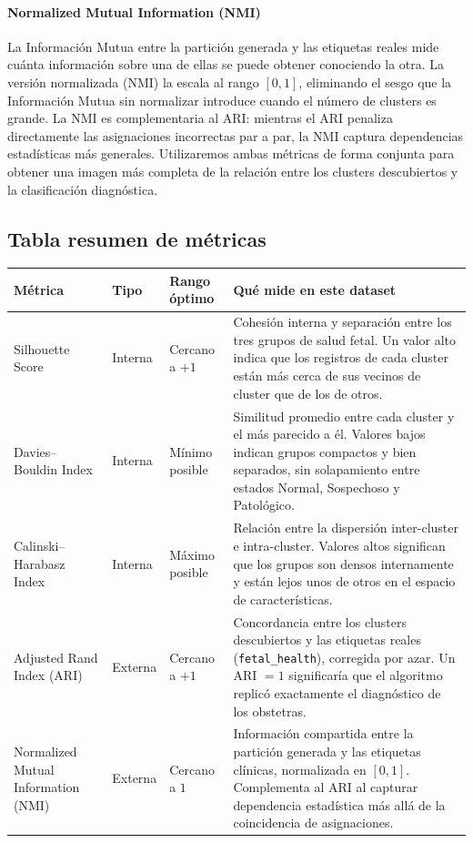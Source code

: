 \documentclass[12pt,letterpaper]{article}
\renewcommand{\arraystretch}{1.30}
\begin{document}
\paragraph{Normalized Mutual Information (NMI)}
La Información Mutua entre la partición generada y las etiquetas reales mide cuánta información
sobre una de ellas se puede obtener conociendo la otra. La versión normalizada (NMI) la escala al
rango $[0, 1]$, eliminando el sesgo que la Información Mutua sin normalizar introduce cuando el
número de clusters es grande. La NMI es complementaria al ARI: mientras el ARI penaliza
directamente las asignaciones incorrectas par a par, la NMI captura dependencias estadísticas más
generales. Utilizaremos ambas métricas de forma conjunta para obtener una imagen más completa de
la relación entre los clusters descubiertos y la clasificación diagnóstica.

\subsection{Tabla resumen de métricas}

\begin{table}[H]
\centering
\small
\renewcommand{\arraystretch}{1.3}
\begin{tabular}{|p{2.5cm}|p{2.5cm}|p{2.5cm}|p{7.5cm}|}
\hline
\rowcolor{headbg}
\textbf{Métrica} & \textbf{Tipo} & \textbf{Rango óptimo} & \textbf{Qué mide en este dataset} \\
\hline
Silhouette Score & Interna & Cercano a $+1$ & Cohesión interna y separación entre los tres grupos de salud fetal. Un valor alto indica que los registros de cada cluster están más cerca de sus vecinos de cluster que de los de otros. \\
\hline
Davies--Bouldin Index & Interna & Mínimo posible & Similitud promedio entre cada cluster y el más parecido a él. Valores bajos indican grupos compactos y bien separados, sin solapamiento entre estados Normal, Sospechoso y Patológico. \\
\hline
Calinski--Harabasz Index & Interna & Máximo posible & Relación entre la dispersión inter-cluster e intra-cluster. Valores altos significan que los grupos son densos internamente y están lejos unos de otros en el espacio de características. \\
\hline
Adjusted Rand Index (ARI) & Externa & Cercano a $+1$ & Concordancia entre los clusters descubiertos y las etiquetas reales (\texttt{fetal\_health}), corregida por azar. Un ARI $= 1$ significaría que el algoritmo replicó exactamente el diagnóstico de los obstetras. \\
\hline
Normalized Mutual Information (NMI) & Externa & Cercano a $1$ & Información compartida entre la partición generada y las etiquetas clínicas, normalizada en $[0, 1]$. Complementa al ARI al capturar dependencia estadística más allá de la coincidencia de asignaciones. \\
\hline
\end{tabular}
\end{table}
\end{document}

